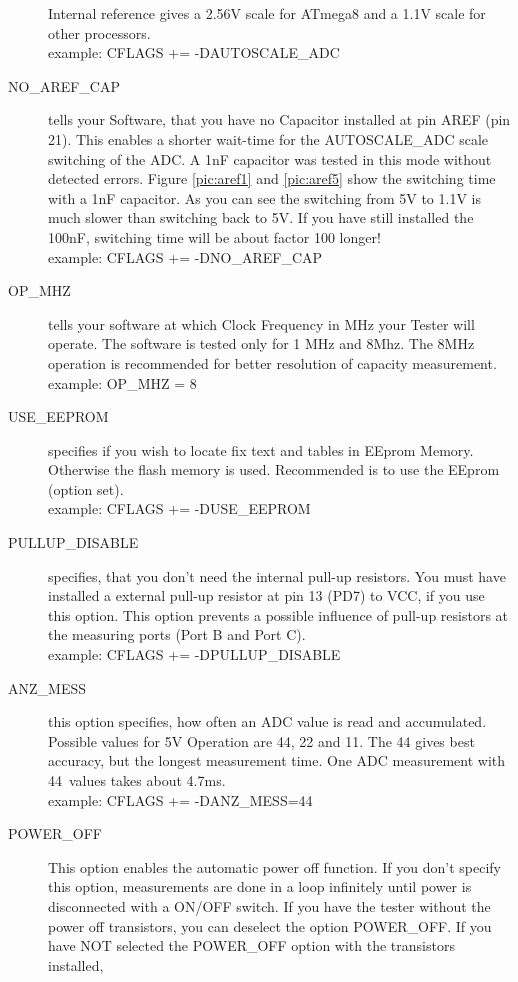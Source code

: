 \begin{description}
Internal reference gives a 2.56V scale for ATmega8 and a 1.1V scale for other processors.\\
example: CFLAGS += -DAUTOSCALE\_ADC
  \item[NO\_AREF\_CAP] tells your Software, that you have no Capacitor installed at pin AREF (pin 21).
This enables a shorter wait-time for the AUTOSCALE\_ADC scale switching of the ADC.
A 1nF capacitor was tested in this mode without detected errors.
Figure \ref{pic:aref1} and \ref{pic:aref5} show the switching time with a 1nF capacitor.
As you can see the switching from 5V to 1.1V is much slower than switching back to 5V. If you
have still installed the 100nF, switching time will be about factor 100 longer!\\
example: CFLAGS += -DNO\_AREF\_CAP
  \item[OP\_MHZ] tells your software at which Clock Frequency in MHz your Tester will operate.
The software is tested only for 1 MHz and 8Mhz. The 8MHz operation is recommended for better resolution of capacity measurement.\\
example: OP\_MHZ = 8
  \item[USE\_EEPROM] specifies if you wish to locate fix text and tables in EEprom Memory. Otherwise the flash memory is used.
Recommended is to use the EEprom (option set).\\
example: CFLAGS += -DUSE\_EEPROM
  \item[PULLUP\_DISABLE] specifies, that you don't need the internal pull-up resistors.
 You must have installed a external pull-up resistor at pin 13 (PD7) to VCC, if you use this option.
This option prevents a possible influence of pull-up resistors at the measuring ports (Port B and Port C).\\
example: CFLAGS += -DPULLUP\_DISABLE
  \item[ANZ\_MESS] this option specifies, how often an ADC value is read and accumulated.
Possible values for 5V Operation are 44, 22 and 11. The 44 gives best accuracy, but the longest measurement time.
One ADC measurement with 44~values takes about 4.7ms.\\
example: CFLAGS += -DANZ\_MESS=44
  \item[POWER\_OFF] This option enables the automatic power off function. If you don't specify this option,
 measurements are done in a loop infinitely  until power is disconnected with a ON/OFF switch.
If you have the tester without the power off transistors, you can deselect the option POWER\_OFF.
If you have NOT selected the POWER\_OFF option with the transistors installed,

\end{description}

